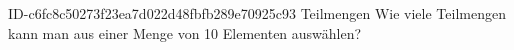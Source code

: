 \begin{exercise}
      {ID-c6fc8c50273f23ea7d022d48fbfb289e70925c93}
      {Teilmengen}
  \ifproblem\problem
    Wie viele Teilmengen kann man aus einer Menge von 10 Elementen auswählen?
  \fi
\end{exercise}
